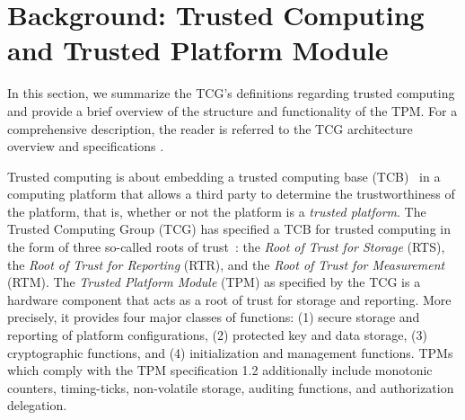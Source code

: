 \documentclass[11pt,letterpaper]{article}
\begin{document}
\section{Background: Trusted Computing and Trusted Platform Module}\label{sec:background}
In this section, we summarize the TCG's definitions regarding trusted computing and provide a brief
overview of the structure and functionality of the TPM. For a comprehensive description, the reader
is referred to the TCG architecture overview and specifications \cite{TCGArch, TCGSpec}.

Trusted computing is about embedding a trusted computing base (TCB)~\cite{Bishop2003} in a computing
platform that allows a third party to determine the trustworthiness of the platform, that is,
whether or not the platform is a \emph{trusted platform}.
The Trusted
Computing Group (TCG) has specified a TCB for trusted computing in the form of three so-called roots
of trust~\cite{TCGArch}: the \emph{Root of Trust for Storage} (RTS), the \emph{Root of Trust for
Reporting} (RTR), and the \emph{Root of Trust for Measurement} (RTM). The \emph{Trusted Platform
Module} (TPM) as specified by the TCG is a hardware component that acts as a root of trust for
storage and reporting. More precisely, it provides four major classes of functions: (1) secure
storage and reporting of platform configurations, (2) protected key and data storage, (3)
cryptographic functions, and (4) initialization and management functions. TPMs which comply with
the TPM specification 1.2 additionally include monotonic counters, timing-ticks, non-volatile
storage, auditing functions, and authorization delegation.
\end{document}
